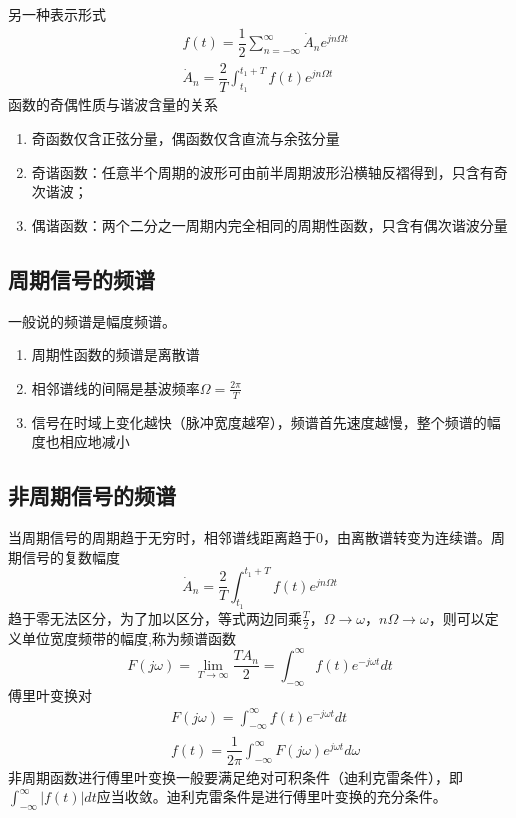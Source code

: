 另一种表示形式
\begin{align}
    &f(t)=\dfrac{1}{2}\sum_{n=-\infty}^{\infty}\dot{A}_n e^{jn\Omega t}\\
    &\dot{A}_n = \dfrac{2}{T}\int_{t_1}^{t_1 +T}f(t)e^{jn\Omega t}
\end{align}
函数的奇偶性质与谐波含量的关系
\begin{enumerate}
    \item 奇函数仅含正弦分量，偶函数仅含直流与余弦分量
    \item 奇谐函数：任意半个周期的波形可由前半周期波形沿横轴反褶得到，只含有奇次谐波；
    \item 偶谐函数：两个二分之一周期内完全相同的周期性函数，只含有偶次谐波分量
\end{enumerate}
\subsection{周期信号的频谱}
一般说的频谱是幅度频谱。
\begin{enumerate}
    \item 周期性函数的频谱是离散谱
    \item 相邻谱线的间隔是基波频率$\Omega =\frac{2 \pi }{T}$
    \item 信号在时域上变化越快（脉冲宽度越窄），频谱首先速度越慢，整个频谱的幅度也相应地减小
\end{enumerate}
\subsection{非周期信号的频谱}
当周期信号的周期趋于无穷时，相邻谱线距离趋于0，由离散谱转变为连续谱。周期信号的复数幅度
\begin{equation}
    \dot{A}_n = \dfrac{2}{T}\int_{t_1}^{t_1 +T}f(t)e^{jn\Omega t}
\end{equation}
趋于零无法区分，为了加以区分，等式两边同乘$\frac{T}{2}$，$\Omega \to \omega$，$n \Omega \to \omega$，则可以定义单位宽度频带的幅度,称为频谱函数
\begin{equation}
    F(j\omega)=\lim_{T \to \infty}\dfrac{T A_n}{2}=\int_{-\infty}^{\infty}f(t)e^{-j\omega t}dt
\end{equation}
傅里叶变换对
\begin{align}
    &F(j\omega)=\int_{-\infty}^{\infty}f(t)e^{-j\omega t}dt\\
    &f(t)=\dfrac{1}{2\pi}\int_{-\infty}^{\infty}F(j \omega )e^{j\omega t}d\omega
\end{align}
非周期函数进行傅里叶变换一般要满足绝对可积条件（迪利克雷条件），即$\int_{-\infty}^{\infty}|f(t)|dt$应当收敛。迪利克雷条件是进行傅里叶变换的充分条件。

